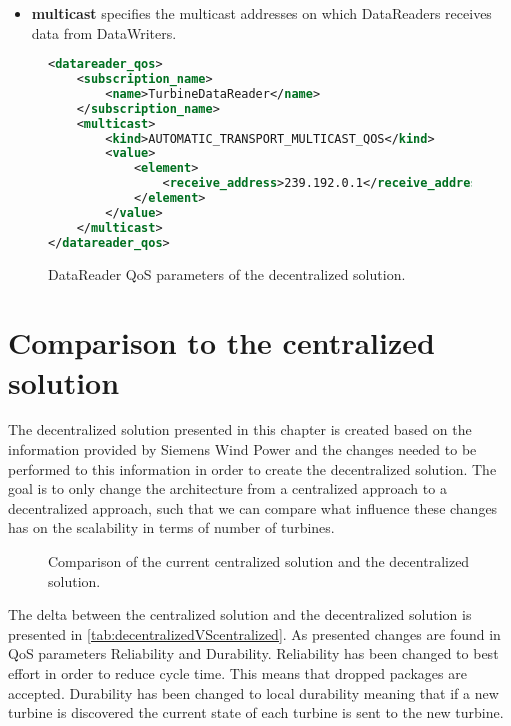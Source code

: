 \begin{itemize}
	\item \textbf{multicast} specifies the multicast addresses on which DataReaders receives data from DataWriters. 
\end{itemize}

\begin{figure}[!h]
\begin{lstlisting}[language=XML]
<datareader_qos>
	<subscription_name>
		<name>TurbineDataReader</name>
	</subscription_name>
	<multicast>
		<kind>AUTOMATIC_TRANSPORT_MULTICAST_QOS</kind>
		<value>
			<element>
				<receive_address>239.192.0.1</receive_address>
			</element>
		</value>
	</multicast>
</datareader_qos>
\end{lstlisting}
\caption[Decentralized DataReader QoS parameters]{
		\label{fig:decDataReaderQos} 
		\footnotesize{DataReader QoS parameters of the decentralized solution.}
	}
\end{figure}

\section{Comparison to the centralized solution}
The decentralized solution presented in this chapter is created based on the information provided by Siemens Wind Power and the changes needed to be performed to this information in order to create the decentralized solution.
The goal is to only change the architecture from a centralized approach to a decentralized approach, such that we can compare what influence these changes has on the scalability in terms of number of turbines.

\begin{figure}[!h]
	\centering
	
	\caption[Comparison of the current centralized solution and the decentralized solution]{
		\label{fig:projectDiffOverviewCentralizedDecentralized}
		\footnotesize{%
			Comparison of the current centralized solution and the decentralized solution.
		}
	}
\end{figure}


The delta between the centralized solution and the decentralized solution is presented in \cref{tab:decentralizedVScentralized}. As presented changes are found in QoS parameters Reliability and Durability. Reliability has been changed to best effort in order to reduce cycle time. This means that dropped packages are accepted. Durability has been changed to local durability meaning that if a new turbine is discovered the current state of each turbine is sent to the new turbine.

